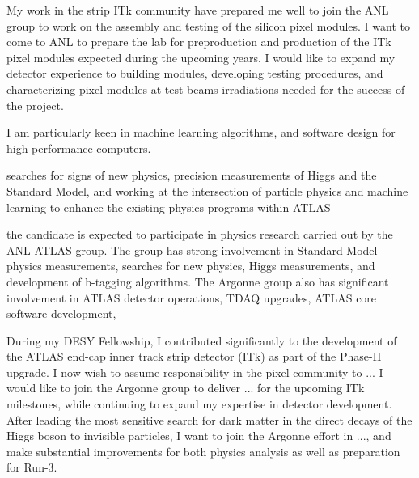 \documentclass[a4paper]{article}
\begin{document}
My work in the strip ITk community have prepared me well to join the ANL group to work on the assembly and testing of the silicon pixel modules. I want to come to ANL to prepare the lab for preproduction and production of the ITk pixel modules expected during the upcoming years.
I would like to expand my detector experience to building modules, developing testing procedures, and characterizing pixel modules at test beams
irradiations needed for the success of the project.




I am particularly keen in machine learning algorithms, and software design for high-performance computers.


searches for signs of new physics, precision measurements of Higgs and the Standard Model, and working at the intersection of particle physics and machine learning to enhance the existing physics programs within ATLAS



the candidate is expected to participate in physics research carried out by the ANL ATLAS group. The group has strong involvement in Standard Model physics measurements, searches for new physics, Higgs measurements, and development of b-tagging algorithms. The Argonne group also has significant involvement in ATLAS detector operations, TDAQ upgrades, ATLAS core software development,



During my DESY Fellowship, I contributed significantly to the development of the ATLAS end-cap inner track strip detector (ITk) as part of the Phase-II upgrade. I now wish to assume responsibility in the pixel community to ...
I would like to join the Argonne group to deliver ... for the upcoming ITk milestones, while continuing to expand my expertise in detector development.
After leading the most sensitive search for dark matter in the direct decays of the Higgs boson to invisible particles, I want to join the
Argonne effort in ..., and make substantial improvements for both physics analysis as well as preparation for Run-3.
\end{document}
